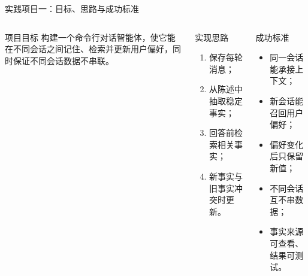 \begin{frame}{实践项目一：目标、思路与成功标准}
  \begin{columns}[T,onlytextwidth]
      \begin{block}{项目目标}
        构建一个命令行对话智能体，使它能在不同会话之间记住、检索并更新用户偏好，同时保证不同会话数据不串联。
      \end{block}
      \begin{block}{实现思路}
        \begin{enumerate}
          \item 保存每轮消息；
          \item 从陈述中抽取稳定事实；
          \item 回答前检索相关事实；
          \item 新事实与旧事实冲突时更新。
        \end{enumerate}
      \end{block}
      \begin{block}{成功标准}
        \begin{itemize}
          \item 同一会话能承接上下文；
          \item 新会话能召回用户偏好；
          \item 偏好变化后只保留新值；
          \item 不同会话互不串数据；
          \item 事实来源可查看、结果可测试。
        \end{itemize}
      \end{block}
  \end{columns}
\end{frame}

